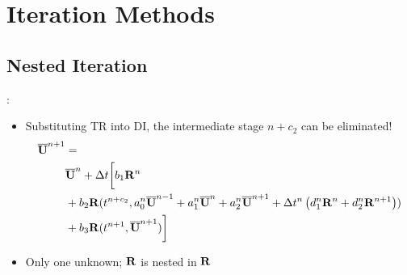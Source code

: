 \documentclass[aspectratio=169,serif]{beamer} %
\begin{document}
\section{Iteration Methods}

\subsection{Nested Iteration}


\begin{frame}{\secname: \subsecname}
  \begin{itemize}
    \item Substituting TR into DI, the intermediate stage $n+c_2$ can be eliminated!
          \begin{equation}
            \begin{aligned}
              \overline{\mathbf{U}}^{n+1} & =                       \\
                        & \overline{\mathbf{U}}^{n} + {\Delta} t\biggl[
              b_1 \mathbf{R}^n                            \\
                        & +
                b_2 \mathbf{R}(t^{n+c_2},a^n_0\overline{\mathbf{U}}^{n - 1} +
                a^n_1\overline{\mathbf{U}}^{n} +
                a^n_2\overline{\mathbf{U}}^{n + 1}
                +
                {\Delta} t^n
                \left(
                d^n_1\mathbf{R}^{n} +
                d^n_2\mathbf{R}^{n + 1}
              \right))                            \\
                        & +
                b_3 \mathbf{R}(t^{n+1},\overline{\mathbf{U}}^{n+1})
                \biggr]
              \label{eq:nestedDITR}
            \end{aligned}
          \end{equation}
    \item Only one unknown; $\mathbf{R}$ is nested in $\mathbf{R}$
  \end{itemize}
\end{frame}
\end{document}
